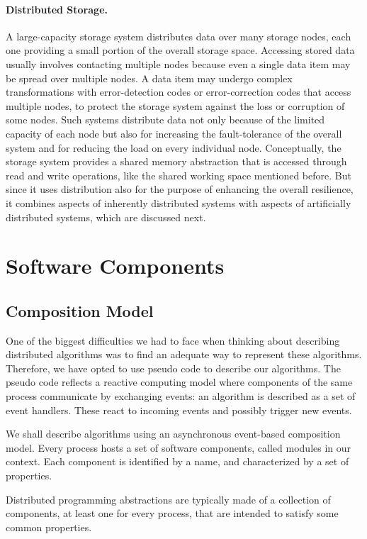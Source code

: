 \documentclass{book}
\begin{document}
\paragraph{Distributed Storage.}
A large-capacity storage system distributes data over many
storage nodes, each one providing a small portion of the overall storage space.
Accessing stored data usually involves contacting multiple nodes because even a
single data item may be spread over multiple nodes. A data item may undergo
complex transformations with error-detection codes or error-correction codes that
access multiple nodes, to protect the storage system against the loss or corruption of
some nodes. Such systems distribute data not only because of the limited capacity
of each node but also for increasing the fault-tolerance of the overall system and for
reducing the load on every individual node.
Conceptually, the storage system provides a shared memory abstraction that is
accessed through read and write operations, like the shared working space mentioned before. But since it uses distribution also for the purpose of enhancing the
overall resilience, it combines aspects of inherently distributed systems with aspects
of artificially distributed systems, which are discussed next.


\section{Software Components}
\subsection{Composition Model}
One of the biggest difficulties we had to face when thinking about describing distributed algorithms was to find an adequate way to represent these algorithms.
\newline
Therefore, we have opted to use pseudo code to describe our algorithms.
The pseudo code reflects a reactive computing model where components of the same process communicate by exchanging events: an algorithm is described as a set of event handlers.
These react to incoming events and possibly trigger new events.

We shall describe algorithms using an asynchronous event-based composition model.
Every process hosts a set of software components, called modules in our context.
Each component is identified by a name, and characterized by a set of properties.

Distributed programming abstractions are typically made of a collection of components, at least one for every process, that are intended to satisfy some common properties.
\end{document}
